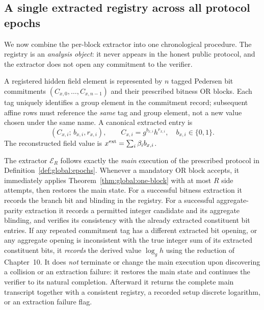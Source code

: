 \subsection{A single extracted registry across all protocol epochs}\label{sec:global:registry}
We now combine the per-block extractor into one
chronological procedure. The registry is an
\emph{analysis object}: it never appears in the
honest public protocol, and the extractor does
not open any commitment to the verifier.

\begin{definition}\label{def:global:registry}
A registered hidden field element is represented
by $n$ tagged Pedersen bit commitments
$(C_{x,0},\ldots,C_{x,n-1})$ and their
prescribed bitness OR blocks. Each tag uniquely
identifies a group element in the commitment
record; subsequent affine rows must reference
the \emph{same} tag and group element, not a
new value chosen under the same name.
A canonical extracted entry is
\[
 (C_{x,i};\,b_{x,i},r_{x,i}),\qquad
 C_{x,i}=g^{b_{x,i}}h^{r_{x,i}},
 \quad b_{x,i}\in\{0,1\}.
\]
The reconstructed field value is
$x^{\rm ext}=\sum_i\beta_i b_{x,i}$.
\end{definition}

\begin{definition}\label{def:global:extractor}
The extractor $\mathcal E_R$ follows exactly
the \emph{main} execution of the prescribed
protocol in Definition~\ref{def:global:epochs}.
Whenever a mandatory OR block accepts,
it immediately applies
Theorem~\ref{thm:global:one-block}
with at most $R$ side attempts, then restores
the main state. For a successful bitness
extraction it records the branch bit and
blinding in the registry.
For a successful aggregate-parity extraction
it records a permitted integer candidate
and its aggregate blinding, and verifies
its consistency with the already extracted
constituent bit entries.
If any repeated commitment tag has a different
extracted bit opening, or any aggregate
opening is inconsistent with the true
integer sum of its extracted constituent
bits, it \emph{records} the derived
value $\log_g h$ using the reduction
of Chapter~10. It does \emph{not}
terminate or change the main execution
upon discovering a collision or an
extraction failure: it restores the
main state and continues the verifier
to its natural completion.
Afterward it returns the complete
main transcript together with a
consistent registry, a recorded setup
discrete logarithm, or an extraction
failure flag.
\end{definition}

